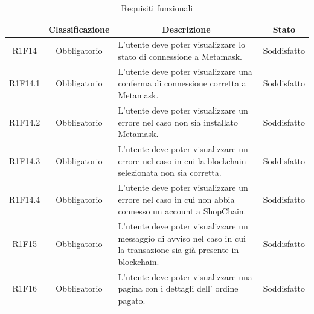 \begin{table}[H]
    \centering
    \renewcommand{\arraystretch}{1.8}
    \begin{tabular}{c | c | p{6cm} | c}
        \rowcolor[HTML]{125E28}
        \multicolumn{1}{c}{\color[HTML]{FFFFFF} \textbf{Codice}}          &
        \multicolumn{1}{c}{\color[HTML]{FFFFFF} \textbf{Classificazione}} &
        \multicolumn{1}{c}{\color[HTML]{FFFFFF} \textbf{Descrizione}}     &
        \multicolumn{1}{c}{\color[HTML]{FFFFFF} \textbf{Stato}}                                                                                                                                                                   \\
        \hline
        R1F14                                                             & Obbligatorio & L'utente deve poter visualizzare lo stato di connessione a Metamask\glo{}.                                       &Soddisfatto                      \\
        R1F14.1                                                           & Obbligatorio & L'utente deve poter visualizzare una conferma di connessione corretta a Metamask\glo{}.                      & Soddisfatto                     \\
        R1F14.2                                                           & Obbligatorio & L'utente deve poter visualizzare un errore nel caso non sia installato Metamask\glo{}.                                             & Soddisfatto   \\
        R1F14.3                                                           & Obbligatorio & L'utente deve poter visualizzare un errore nel caso in cui la blockchain selezionata non sia corretta.                       & Soddisfatto   \\
        R1F14.4                                                           & Obbligatorio & L'utente deve poter visualizzare un errore nel caso in cui non abbia connesso un account a ShopChain.                        & Soddisfatto   \\
        R1F15                                                             & Obbligatorio & L'utente deve poter visualizzare un messaggio di avviso nel caso in cui la transazione sia già presente in blockchain\glo{}. & Soddisfatto \\
        R1F16                                                             &Obbligatorio  & L'utente deve poter visualizzare una pagina con i dettagli dell' ordine pagato.                                               & Soddisfatto\\
   
    \end{tabular}
    \caption{Requisiti funzionali}
\end{table}



